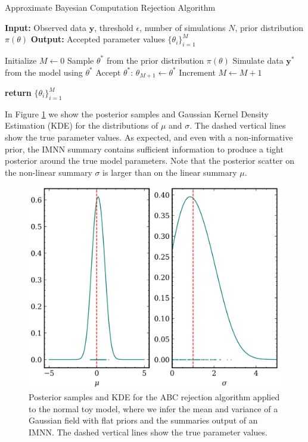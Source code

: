\begin{algorithm}
    \caption{Approximate Bayesian Computation Rejection Algorithm}\label{alg:ABC}
    \begin{algorithmic}[1]
    \State \textbf{Input:} Observed data $\mathbf{y}$, threshold $\epsilon$, number of simulations $N$, prior distribution $\pi(\theta)$
    \State \textbf{Output:} Accepted parameter values $\{\theta_i\}_{i=1}^M$
    
    \State Initialize $M \gets 0$
        \State Sample $\theta^*$ from the prior distribution $\pi(\theta)$
        \State Simulate data $\mathbf{y}^*$ from the model using $\theta^*$
            \State Accept $\theta^*$: $\theta_{M+1} \gets \theta^*$
            \State Increment $M \gets M + 1$
        \EndIf
    \EndFor
    
    \State \textbf{return} $\{\theta_i\}_{i=1}^M$
    \end{algorithmic}
    \end{algorithm}
In Figure \ref{fig:IMNN normal posterior} we show the posterior samples and Gaussian Kernel Density Estimation (KDE) for the distributions of $\mu$ and $\sigma$. The dashed vertical lines show the true parameter values. As expected, and even with a non-informative prior, the IMNN summary contains sufficient information to produce a tight posterior around the true model parameters. Note that the posterior scatter on the non-linear summary $\sigma$ is larger than on the linear summary $\mu$.

\begin{figure}
    \centering
    \includegraphics[width=0.75\linewidth]{img/ML/ABC_posteriors_normal.png}
    \caption{Posterior samples and KDE for the ABC rejection algorithm applied to the normal toy model, where we infer the mean and variance of a Gaussian field with flat priors and the summaries output of an IMNN. The dashed vertical lines show the true parameter values.}
    \label{fig:IMNN normal posterior}
\end{figure}






